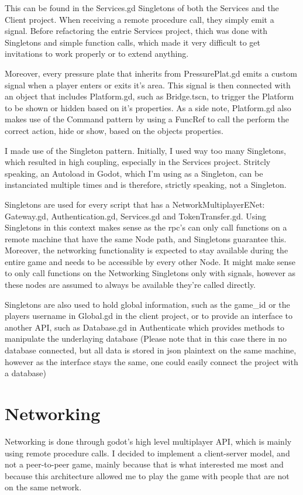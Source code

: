 \documentclass{article}
\begin{document}
This can be found in the Services.gd Singletons of both the Services and the Client project. When receiving a remote procedure call, they simply emit a signal. Before refactoring the entrie Services project, thich was done with Singletons and simple function calls, which made it very difficult to get invitations to work properly or to extend anything. 

Moreover, every pressure plate that inherits from PressurePlat.gd emits a custom signal when a player enters or exits it's area. This signal is then connected with an object that includes Platform.gd, such as Bridge.tscn, to trigger the Platform to be shown or hidden based on it's properties. As a side note, Platform.gd also makes use of the Command pattern by using a FuncRef to call the perform the correct action, hide or show, based on the objects properties.


\bigskip
I made use of the Singleton pattern. Initially, I used way too many Singletons, which resulted in high coupling, especially in the Services project. Stritcly speaking, an Autoload in Godot, which I'm using as a Singleton, can be instanciated multiple times and is therefore, strictly speaking, not a Singleton.

Singletons are used for every script that has a NetworkMultiplayerENet: Gateway.gd, Authentication.gd, Services.gd and TokenTransfer.gd. Using Singletons in this context makes sense as the rpc's can only call functions on a remote machine that have the same Node path, and Singletons guarantee this. Moreover, the networking functionality is expected to stay available during the entire game and needs to be accessible by every other Node. It might make sense to only call functions on the Networking Singletons only with signals, however as these nodes are assumed to always be available they're called directly.

Singletons are also used to hold global information, such as the game\_id or the players username in Global.gd in the client project, or to provide an interface to another API, such as Database.gd in Authenticate which provides methods to manipulate the underlaying database (Please note that in this case there in no database connected, but all data is stored in json plaintext on the same machine, however as the interface stays the same, one could easily connect the project with a database)

\section{Networking}
Networking is done through godot's high level multiplayer API, which is mainly using remote procedure calls. I decided to implement a client-server model, and not a peer-to-peer game, mainly because that is what interested me most and because this architecture allowed me to play the game with people that are not on the same network.
\end{document}
